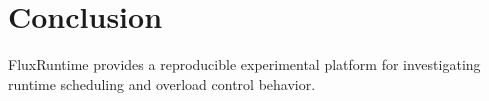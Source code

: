 \section{Conclusion}

FluxRuntime provides a reproducible experimental platform for investigating runtime scheduling and overload control behavior.
